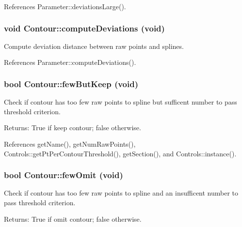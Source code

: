 References Parameter::deviationsLarge().\hypertarget{classContour_2b4e79e18f6468763669052d312235e8}{
\subsubsection[computeDeviations]{\setlength{\rightskip}{0pt plus 5cm}void Contour::computeDeviations (void)}}
\label{classContour_2b4e79e18f6468763669052d312235e8}


Compute deviation distance between raw points and splines. 

References Parameter::computeDeviations().\hypertarget{classContour_b8df5352cb0220e352a455ea21a8cd3c}{
\subsubsection[fewButKeep]{\setlength{\rightskip}{0pt plus 5cm}bool Contour::fewButKeep (void)}}
\label{classContour_b8df5352cb0220e352a455ea21a8cd3c}


Check if contour has too few raw points to spline but sufficent number to pass threshold criterion. \begin{Desc}
\item[Returns:]True if keep contour; false otherwise. \end{Desc}


References getName(), getNumRawPoints(), Controls::getPtPerContourThreshold(), getSection(), and Controls::instance().\hypertarget{classContour_d548a8000efd6af7dcf3b80f32395499}{
\subsubsection[fewOmit]{\setlength{\rightskip}{0pt plus 5cm}bool Contour::fewOmit (void)}}
\label{classContour_d548a8000efd6af7dcf3b80f32395499}


Check if contour has too few raw points to spline and an insufficent number to pass threshold criterion. \begin{Desc}
\item[Returns:]True if omit contour; false otherwise. \end{Desc}


